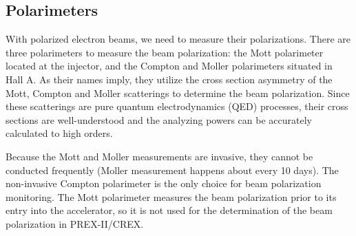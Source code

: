 \subsection{Polarimeters}
With polarized electron beams, we need to measure their polarizations.
There are three polarimeters to measure the beam polarization: the Mott polarimeter
located at the injector, and the Compton and Moller polarimeters situated in Hall A.
As their names imply, they utilize the cross section asymmetry of the Mott, Compton and Moller
scatterings to determine the beam polarization. Since these scatterings are
pure quantum electrodynamics (QED) processes, their cross sections are 
well-understood and the analyzing powers can be accurately calculated to high orders.

Because the Mott and Moller measurements are invasive, they cannot be conducted frequently
(Moller measurement happens about every 10 days).
The non-invasive Compton polarimeter is the only choice for beam polarization monitoring. 
The Mott polarimeter measures the beam polarization prior to its entry into the accelerator, 
so it is not used for the determination of the beam polarization in PREX-II/CREX.

